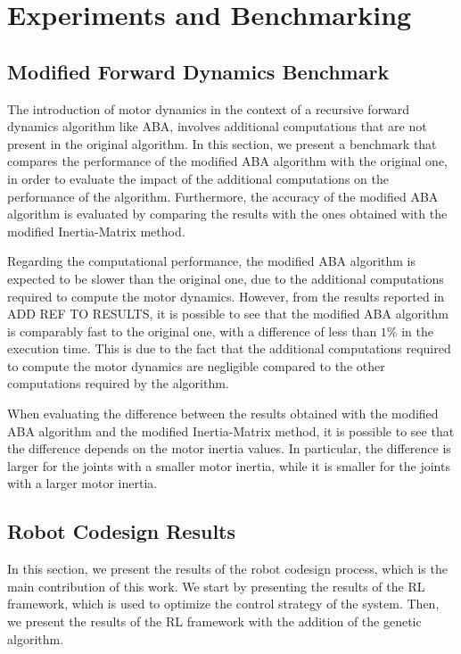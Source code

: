 \chapter{Experiments and Benchmarking}
\label{chp:contrib_ResultsDiscussion}

\section{Modified Forward Dynamics Benchmark}

The introduction of motor dynamics in the context of a recursive forward dynamics algorithm like \ac{ABA}, involves additional computations that are not present in the original algorithm. In this section, we present a benchmark that compares the performance of the modified \ac{ABA} algorithm with the original one, in order to evaluate the impact of the additional computations on the performance of the algorithm. Furthermore, the accuracy of the modified \ac{ABA} algorithm is evaluated by comparing the results with the ones obtained with the modified Inertia-Matrix method.

Regarding the computational performance, the modified \ac{ABA} algorithm is expected to be slower than the original one, due to the additional computations required to compute the motor dynamics. However, from the results reported in ADD REF TO RESULTS, it is possible to see that the modified \ac{ABA} algorithm is comparably fast to the original one, with a difference of less than $1\%$ in the execution time. This is due to the fact that the additional computations required to compute the motor dynamics are negligible compared to the other computations required by the algorithm.

When evaluating the difference between the results obtained with the modified \ac{ABA} algorithm and the modified Inertia-Matrix method, it is possible to see that the difference depends on the motor inertia values. In particular, the difference is larger for the joints with a smaller motor inertia, while it is smaller for the joints with a larger motor inertia.



\section{Robot Codesign Results}

In this section, we present the results of the robot codesign process, which is the main contribution of this work. We start by presenting the results of the \ac{RL} framework, which is used to optimize the control strategy of the system. Then, we present the results of the \ac{RL} framework with the addition of the genetic algorithm.

